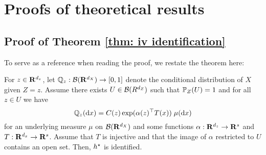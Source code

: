 \chapter{Proofs of theoretical results}

\section{Proof of Theorem \ref{thm: iv identification}}
\label{sec: proof identification}

To serve as a reference when reading the proof, we restate the theorem here:
\begin{thm*}
    For $ z \in \mathbf{R}^{ d_{ z } } $, let $ \mathbb{Q}_{ z } : \mathcal{B} ( \mathbf{R}^{ d_{ X } } ) \to [0, 1] $ denote the conditional distribution of $ X $ given $ Z = z $.
    Assume there exists $ U \in \mathcal{B} ( R^{ d_{ Z } } ) $ such that $ \mathbb{P}_{ Z } ( U ) = 1 $ and for all $ z \in U $ we have
    \begin{equation*}
        \mathbb{Q}_{ z } ( \mathrm{d} x ) = C ( z ) \exp ( \alpha ( z )^{ \top } T ( x ) ) \; \mu ( \mathrm{d} x )
    \end{equation*}
    for an underlying measure $ \mu $ on $ \mathcal{B} ( \mathbf{R}^{ d_{ X } } ) $ and some functions $ \alpha : \mathbf{R}^{ d_{ z } } \to \mathbf{R}^{ s } $ and $ T : \mathbf{R}^{ d_{ x } } \to \mathbf{R}^{ s } $.
    Assume that $ T $ is injective and that the image of $ \alpha $ restricted to $ U $ contains an open set.
    Then, $ h^{ \star } $ is identified.
\end{thm*}

